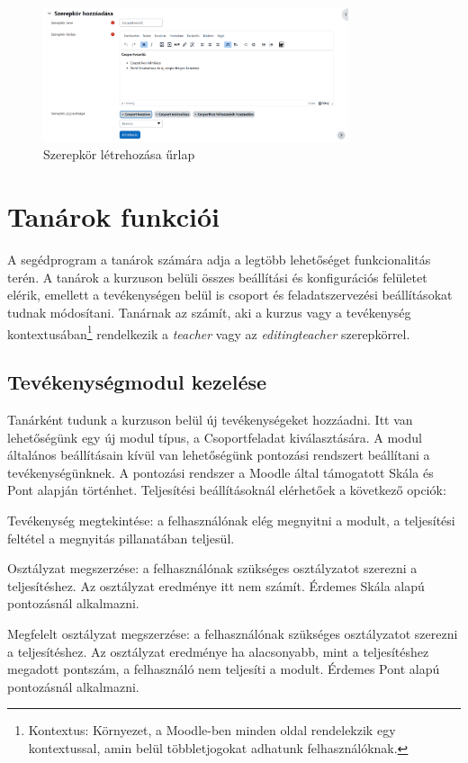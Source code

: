 \begin{figure}[H]
	\centering
	\includegraphics[width=0.8\textwidth,frame]{images/szerepkor_letrehozas.png}
	\caption{Szerepkör létrehozása űrlap}
\end{figure}

\section{Tanárok funkciói}

A segédprogram a tanárok számára adja a legtöbb lehetőséget funkcionalitás terén. A tanárok a kurzuson belüli összes beállítási és konfigurációs felületet elérik, emellett a tevékenységen belül is csoport és feladatszervezési beállításokat tudnak módosítani. Tanárnak az számít, aki a kurzus vagy a tevékenység kontextusában\footnote{Kontextus: Környezet, a Moodle-ben minden oldal rendelekzik egy kontextussal, amin belül többletjogokat adhatunk felhasználóknak.} rendelkezik a \textit{teacher} vagy az \textit{editingteacher} szerepkörrel.

\subsection{Tevékenységmodul kezelése}

Tanárként tudunk a kurzuson belül új tevékenységeket hozzáadni. Itt van lehetőségünk egy új modul típus, a Csoportfeladat kiválasztására. A modul általános beállításain kívül van lehetőségünk pontozási rendszert beállítani a tevékenységünknek. A pontozási rendszer a Moodle által támogatott Skála és Pont alapján történhet. Teljesítési beállításoknál elérhetőek a következő opciók:

\begin{compactitem}
    	\item Tevékenység megtekintése: a felhasználónak elég megnyitni a modult, a teljesítési feltétel a megnyitás pillanatában teljesül.
        \item Osztályzat megszerzése: a felhasználónak szükséges osztályzatot szerezni a teljesítéshez. Az osztályzat eredménye itt nem számít. Érdemes Skála alapú pontozásnál alkalmazni.
        \item Megfelelt osztályzat megszerzése: a felhasználónak szükséges osztályzatot szerezni a teljesítéshez. Az osztályzat eredménye ha alacsonyabb, mint a teljesítéshez megadott pontszám, a felhasználó nem teljesíti a modult. Érdemes Pont alapú pontozásnál alkalmazni.
\end{compactitem}


